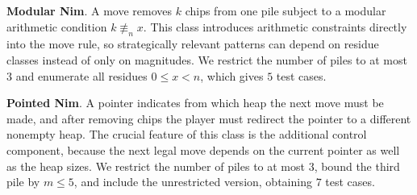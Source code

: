 \documentclass[review]{elsarticle}
\newcommand{\set}[1]{\{ #1 \}}
\newcommand{\tuple}[1]{\langle {#1} \rangle}
\newcommand{\true}{\top}
\newcommand{\statevar}{\mathcal{X}}
\newcommand{\act}{\mathcal{A}}
\newcommand{\constraint}{\mathcal{C}}
\newcommand{\estate}{\mathcal{E}}
\newcommand{\pre}{\mathtt{pre}}
\newcommand{\eff}{\mathtt{eff}}
\newcommand{\nmodulo}{\not \equiv}
\begin{document}
{\color{red}\textbf{Modular Nim}. A move removes $k$ chips from one pile subject to a modular arithmetic condition $k \nmodulo_n x$.}
{\color{red}This class introduces arithmetic constraints directly into the move rule, so strategically relevant patterns can depend on residue classes instead of only on magnitudes.}
{\color{red}We restrict the number of piles to at most $3$ and enumerate all residues $0 \le x < n$, which gives $5$ test cases.}

{\color{red}\textbf{Pointed Nim}. A pointer indicates from which heap the next move must be made, and after removing chips the player must redirect the pointer to a different nonempty heap.}
{\color{red}The crucial feature of this class is the additional control component, because the next legal move depends on the current pointer as well as the heap sizes.}
{\color{red}We restrict the number of piles to at most $3$, bound the third pile by $m \le 5$, and include the unrestricted version, obtaining $7$ test cases.}
\end{document}
